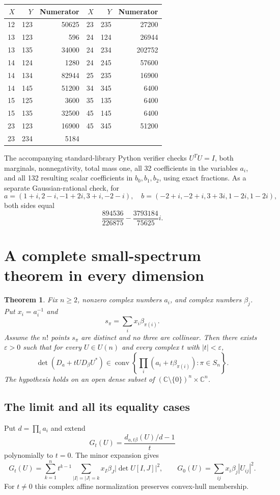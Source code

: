 \documentclass[11pt]{article}
\newtheorem{theorem}{Theorem}[section]\newtheorem{lemma}[theorem]{Lemma}\newtheorem{corollary}[theorem]{Corollary}\newtheorem{proposition}[theorem]{Proposition}
\newcommand{\C}{\mathbb C}\newcommand{\R}{\mathbb R}\newcommand{\conv}{\operatorname{conv}}\newcommand{\diag}{\operatorname{diag}}\newcommand{\tr}{\operatorname{tr}}
\begin{document}
\begin{center}\begin{tabular}{rrr@{\qquad}rrr}
\toprule $X$&$Y$&Numerator&$X$&$Y$&Numerator\\\midrule
12&123&50625&23&235&27200\\
13&123&596&24&124&26944\\
13&135&34000&24&234&202752\\
14&124&1280&24&245&57600\\
14&134&82944&25&235&16900\\
14&145&51200&34&345&6400\\
15&125&3600&35&135&6400\\
15&135&32500&45&145&6400\\
23&123&16900&45&345&51200\\
23&234&5184&&&\\
\bottomrule\end{tabular}\end{center}

The accompanying standard-library Python verifier checks $U^TU=I$, both marginals, nonnegativity, total mass one, all 32 coefficients in the variables $a_i$, and all 132 resulting scalar coefficients in $b_0,b_1,b_2$, using exact fractions. As a separate Gaussian-rational check, for
\[
a=(1+i,2-i,-1+2i,3+i,-2-i),\quad
b=(-2+i,-2+i,3+3i,1-2i,1-2i),
\]
both sides equal
\[
\frac{894536}{226875}-\frac{3793184}{75625}i.
\]

\section{A complete small-spectrum theorem in every dimension}
\begin{theorem}\label{small}
Fix $n\ge2$, nonzero complex numbers $a_i$, and complex numbers $\beta_j$. Put $x_i=a_i^{-1}$ and
\[
s_\pi=\sum_i x_i\beta_{\pi(i)}.
\]
Assume the $n!$ points $s_\pi$ are distinct and no three are collinear. Then there exists $\varepsilon>0$ such that for every $U\in U(n)$ and every complex $t$ with $|t|<\varepsilon$,
\[
\det(D_a+tUD_\beta U^*)\in\conv\left\{\prod_i(a_i+t\beta_{\pi(i)}):\pi\in S_n\right\}.
\]
The hypothesis holds on an open dense subset of $(\C\setminus\{0\})^n\times\C^n$.
\end{theorem}

\subsection{The limit and all its equality cases}
Put $d=\prod_i a_i$ and extend
\[
G_t(U)=\frac{d_{a,t\beta}(U)/d-1}{t}
\]
polynomially to $t=0$. The minor expansion gives
\begin{equation}\label{Gt}
G_t(U)=\sum_{k=1}^n t^{k-1}\sum_{|I|=|J|=k}x_I\beta_J|\det U[I,J]|^2,
\qquad G_0(U)=\sum_{ij}x_i\beta_j|U_{ij}|^2.
\end{equation}
For $t\ne0$ this complex affine normalization preserves convex-hull membership.
\end{document}
